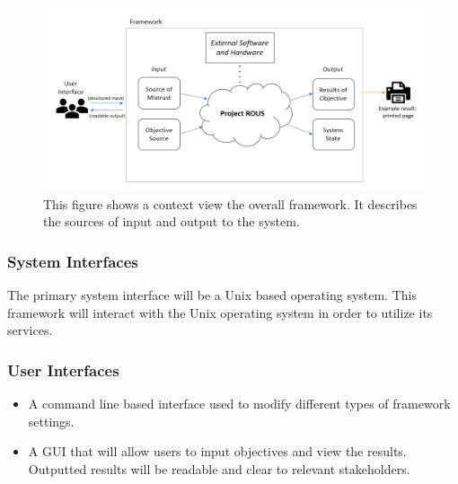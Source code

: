 \documentclass[draftclsnofoot, onecolumn, compsoc, 10pt]{IEEEtran}
\begin{document}
\begin{figure}[!htb]
\centering
	\includegraphics[width=1.0\textwidth]{img_context}
	\caption{This figure shows a context view the overall framework. It describes the sources of input and output to the system.}
  
\end{figure}

\subsubsection{System Interfaces}
The primary system interface will be a Unix based operating system. This framework will interact with the Unix operating system in order to utilize its services. 

\subsubsection{User Interfaces}
\begin{itemize}
\item A command line based interface used to modify different types of framework settings.\\
\item A GUI that will allow users to input objectives and view the results. Outputted results will be readable and clear to relevant stakeholders. 
\end{itemize}
\end{document}
